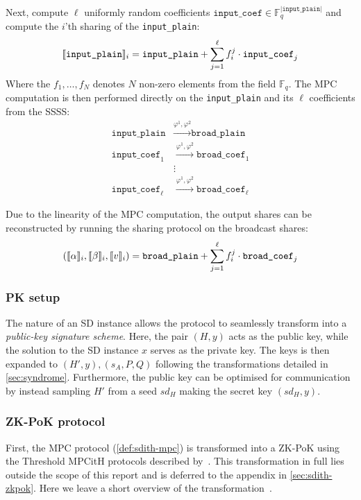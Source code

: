 \documentclass[11pt]{report}
\theoremstyle{definition}
\theoremstyle{plain}
\begin{document}
Next, compute $\ell$ uniformly random coefficients $\texttt{input\_coef} \in \mathbb{F}_q^{|\texttt{input\_plain}|}$ and compute the $i$'th sharing of the \texttt{input\_plain}:
\begin{align}\label{equation:input_sharing}
  \llbracket \texttt{input\_plain} \rrbracket_i = \texttt{input\_plain} + \sum_{j=1}^\ell f_i^j \cdot \texttt{input\_coef}_j
\end{align}
Where the $f_1,\dots,f_N$ denotes $N$ non-zero elements from the field $\mathbb{F}_q$.
The MPC computation is then performed directly on the \texttt{input\_plain} and its $\ell$ coefficients from the SSSS:
\begin{align*}
  \texttt{input\_plain}     & \stackrel{\varphi^1, \varphi^2}{\longrightarrow} \texttt{broad\_plain}     \\
  \texttt{input\_coef}_1    & \stackrel{\varphi^1, \varphi^2}{\longrightarrow} \texttt{broad\_coef}_1    \\
                            & \vdots                                                                     \\
  \texttt{input\_coef}_\ell & \stackrel{\varphi^1, \varphi^2}{\longrightarrow} \texttt{broad\_coef}_\ell
\end{align*}

Due to the linearity of the MPC computation, the output shares can be reconstructed by running the sharing protocol on the broadcast shares:
\begin{align}\label{equation:input_sharing_reverse}
  (\llbracket \alpha \rrbracket_i, \llbracket \beta \rrbracket_i, \llbracket v \rrbracket_i) = \texttt{broad\_plain} + \sum_{j=1}^\ell f_i^j \cdot \texttt{broad\_coef}_j
\end{align}

\subsubsection{PK setup}
The nature of an SD instance allows the protocol to seamlessly transform into a \textit{public-key signature scheme}. Here, the pair $(H, y)$ acts as the public key, while the solution to the SD instance $x$ serves as the private key. The keys is then expanded to $(H', y), (s_A, P, Q)$ following the transformations detailed in \autoref{sec:syndrome}. Furthermore, the public key can be optimised for communication by instead sampling $H'$ from a seed $sd_H$ making the secret key $(sd_H, y)$.

\subsubsection{ZK-PoK protocol}
First, the MPC protocol (\autoref{def:sdith-mpc}) is transformed into a ZK-PoK using the Threshold MPCitH protocols described by~\cite{feneuil2023threshold,feneuil2023threshold2}. This transformation in full lies outside the scope of this report and is deferred to the appendix in \autoref{sec:sdith-zkpok}. Here we leave a short overview of the transformation~\cite{aguilarsyndrome11}.
\end{document}
